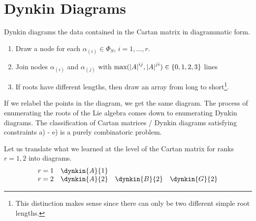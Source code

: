 \section{Dynkin Diagrams}%
\label{sec:dynkin_diagrams}

Dynkin diagrams the data contained in the Cartan matrix in diagrammatic form.
\begin{enumerate}[]
  \item Draw a node for each $\alpha_{(i)} \in \Phi_S$, $i = 1, \dots, r$.
\item Join nodes $\alpha_{(i)}$ and $\alpha_{(j)}$ with $\text{max}(\abs{A}^{ij}, \abs{A}^{ji}) \in \{0, 1, 2, 3\}$ lines
  \item If roots have different lengths, then draw an array from long to short\footnote{This distinction makes sense since there can only be two different simple root lengths.}.
\end{enumerate}
If we relabel the points in the diagram, we get the same diagram. The process of enumerating the roots of the Lie algebra comes down to enumerating Dynkin diagrams.
The classification of Cartan matrices / Dynkin diagrams satisfying constraints a) - e) is a purely combinatoric problem.

\newcommand*{\Dynk}[2]{#1_{#2} & \dynkin{#1}{#2}}

Let us translate what we learned at the level of the Cartan matrix for ranks $r = 1,2$ into diagrams.
\[ \begin{array}{ll}
  r = 1 & \dynkin{A}{1} \\
  r = 2 & \dynkin{A}{2}
	 \quad \dynkin{B}{2}
	 \quad \dynkin{G}{2}
\end{array} \]

